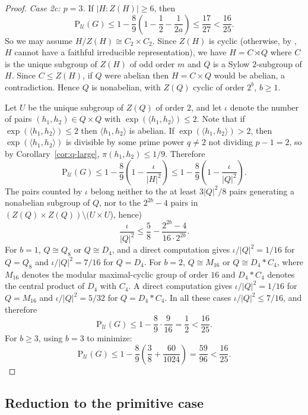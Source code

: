 \documentclass[10pt,a4paper]{amsart}
\newcommand{\Psu}{\mathrm{P}_{\mathcal{U}}}
\begin{document}
\begin{proof}
		\medskip
\noindent\textit{Case 2c: $p = 3$.}
If $|H:Z(H)| \geq 6$, then
$$\Psu(G) \leq 1-\frac{8}{9}\left(1-\frac{1}{2}
-\frac{1}{2a}\right) \leq \frac{17}{27} < \frac{16}{25}.$$
So we may assume $H/Z(H) \cong C_2 \times C_2$. Since $Z(H)$ 
is cyclic (otherwise, by \cite[Proposition 16.8]{dh}, $H$ cannot 
have a faithful irreducible representation), we have 
$H = C \rtimes Q$ where $C$ is the unique subgroup of $Z(H)$ 
of odd order $m$ and $Q$ is a Sylow $2$-subgroup of $H$. 
Since $C \leq Z(H)$, if $Q$ were abelian then $H = C \times Q$ 
would be abelian, a contradiction. Hence $Q$ is nonabelian, 
with $Z(Q)$ cyclic of order $2^b$, $b \geq 1$.



Let $U$ be the unique subgroup of $Z(Q)$ of order $2$, and let $\iota$ denote the number of pairs 
$(h_1,h_2) \in Q \times Q$ with $\exp(\langle h_1,h_2\rangle) 
\leq 2$. Note that if $\exp(\langle h_1,h_2\rangle) \leq 2$ 
then $\langle h_1,h_2\rangle$ is abelian. If 
$\exp(\langle h_1,h_2\rangle) > 2$, then $\exp(\langle h_1,h_2\rangle)$ 
is divisible by some prime power $q \neq 2$ not dividing 
$p-1=2$, so by Corollary~\ref{cor:q-large}, 
$\pi(h_1,h_2)\leq 1/9$. Therefore
$$\Psu(G) \leq 1 - \frac{8}{9}\left(1 - \frac{\iota}{|H|^2}\right)
\leq 1 - \frac{8}{9}\left(1 - \frac{\iota}{|Q|^2}\right).$$
The pairs counted by $\iota$ belong neither to the at least 
$3|Q|^2/8$ pairs generating a nonabelian subgroup of $Q$, nor to 
the $2^{2b}-4$ pairs in $(Z(Q) \times Z(Q)) \setminus (U \times U$), 
hence)
$$\frac{\iota}{|Q|^2} \leq \frac{5}{8} - 
\frac{2^{2b}-4}{16\cdot 2^{2b}}.$$
For $b = 1$, $Q \cong Q_8$ or $Q \cong D_4$, and a direct 
computation gives $\iota/|Q|^2 = 1/16$ for $Q = Q_8$ 
and $\iota/|Q|^2 = 7/16$ for $Q = D_4$.
For $b = 2$, $Q \cong M_{16}$ or $Q \cong D_4 \ast C_4$, 
where $M_{16}$ denotes the modular maximal-cyclic group of 
order $16$ and $D_4 \ast C_4$ denotes the central product 
of $D_4$ with $C_4$. A direct computation gives 
$\iota/|Q|^2 = 1/16$ for $Q = M_{16}$ and 
$\iota/|Q|^2 = 5/32$ for $Q = D_4 \ast C_4$.
In all these cases $\iota/|Q|^2 \leq 7/16$, and therefore
$$\Psu(G) \leq 1 - \frac{8}{9}\cdot\frac{9}{16} = \frac{1}{2} 
< \frac{16}{25}.$$
For $b \geq 3$, using $b=3$ to minimize:
$$\Psu(G) \leq 1 - \frac{8}{9}\left(\frac{3}{8} + 
\frac{60}{1024}\right) = \frac{59}{96} < \frac{16}{25}.$$
	\end{proof}

		
	
	
	\subsection{Reduction to the primitive case}
	
\end{document}
